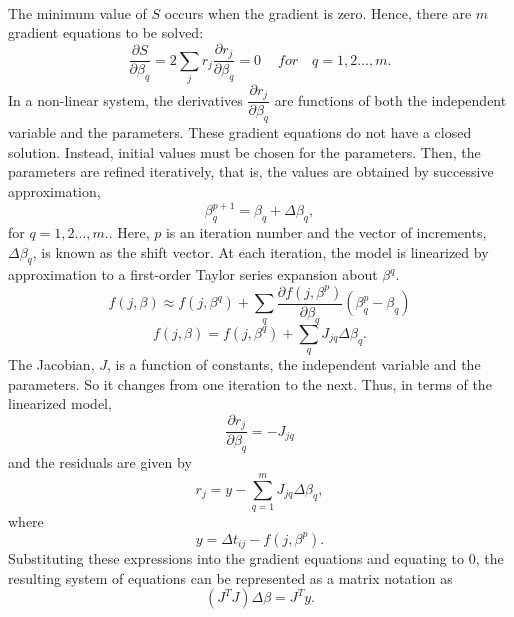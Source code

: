 \documentclass[a4paper,10pt]{report}
\begin{document}
\paragraph*{}
The minimum value of $S$ occurs when the gradient is zero. Hence, there are $m$ gradient equations to be solved:
\begin{equation}
    \dfrac{\partial S}{\partial \beta_q}=2\sum_j r_j\dfrac{\partial r_j}{\partial \beta_q}=0 \ \quad for \quad q=1,2...,m.
\end{equation}
In a non-linear system, the derivatives $\dfrac{\partial r_j}{\partial \beta_q}$ are functions of both the independent variable and the parameters. These gradient equations do not have a closed solution. Instead, initial values must be chosen for the
parameters. Then, the parameters are refined iteratively, that is, the values are obtained by successive approximation,
\begin{equation}
    \beta_q^{p+1}=\beta_q + \Delta \beta_q,
\end{equation}
for $q=1,2...,m.$. Here, $p$ is an iteration number and the vector of increments, $\Delta \beta_q$, is known as the shift vector. At each iteration, the model is linearized by approximation to a first-order Taylor series expansion about $\beta^q$.
\begin{equation}
    f(j,\beta)  \approx f(j,\beta^q) +\sum_q \dfrac{\partial f(j, \beta^p)}{\partial \beta_q} \left(\beta_q^p -\beta_q \right)
\end{equation}
\begin{equation}
 f(j,\beta) =f(j, \beta^q)+\sum_q J_{jq} \Delta\beta_q.
\end{equation}
The Jacobian, $J$, is a function of constants, the independent variable and the parameters. So it changes from one iteration to the
next. Thus, in terms of the linearized model,
\begin{equation}
\dfrac{\partial r_j}{\partial \beta_q}=-J_{jq}
\end{equation}
and the residuals are given by
\begin{equation}
    r_j= y - \sum_{q=1}^{m} J_{jq}\Delta\beta_q,
\end{equation}
where
\begin{equation}
 y =\Delta t_{ij}- f(j, \beta^p).
\end{equation}
Substituting these expressions into the gradient equations and equating to $0$, the resulting system of equations can be represented as a matrix notation as
\begin{equation}
    \left(J^TJ\right)\Delta  \beta=J^Ty.
\end{equation}
\end{document}
